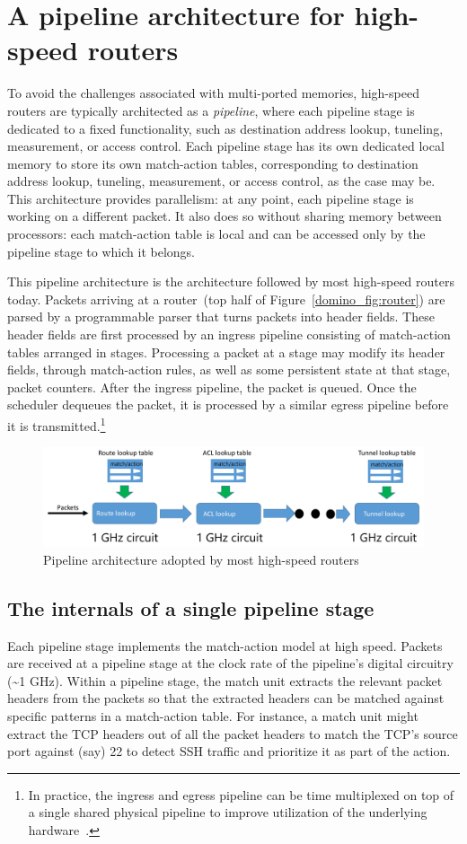 \section{A pipeline architecture for high-speed routers}
To avoid the challenges associated with multi-ported memories, high-speed
routers are typically architected as a {\em pipeline}, where each pipeline
stage is dedicated to a fixed functionality, such as destination address
lookup, tuneling, measurement, or access control. Each pipeline stage has its
own dedicated local memory to store its own match-action tables, corresponding
to destination address lookup, tuneling, measurement, or access control, as the
case may be. This architecture provides parallelism: at any point, each
pipeline stage is working on a different packet. It also does so without
sharing memory between processors: each match-action table is local and can be
accessed only by the pipeline stage to which it belongs.

This pipeline architecture is the architecture followed by most high-speed
routers today. Packets arriving at a router~(top half of
Figure~\ref{domino_fig:router}) are parsed by a programmable parser that turns
packets into header fields. These header fields are first processed by an
ingress pipeline consisting of match-action tables arranged in stages.
Processing a packet at a stage may modify its header fields, through
match-action rules, as well as some persistent state at that stage, \eg packet
counters. After the ingress pipeline, the packet is queued. Once the scheduler
dequeues the packet, it is processed by a similar egress pipeline before it is
transmitted.\footnote{In practice, the ingress and egress pipeline can be time
multiplexed on top of a single shared physical pipeline to improve utilization
of the underlying hardware~\cite{rmt}.}

\begin{figure}[!t]
\includegraphics[width=\textwidth]{pipeline.pdf}
\caption{Pipeline architecture adopted by most high-speed routers}
\label{fig:pipeline}
\end{figure}

\subsection{The internals of a single pipeline stage} Each pipeline stage implements
the match-action model at high speed. Packets are received at a pipeline stage
at the clock rate of the pipeline's digital circuitry (\textasciitilde1 GHz).
Within a pipeline stage, the match unit extracts the relevant packet headers
from the packets so that the extracted headers can be matched against specific
patterns in a match-action table. For instance, a match unit might extract the
TCP headers out of all the packet headers to match the TCP's source port
against (say) 22 to detect SSH traffic and prioritize it as part of the action.

